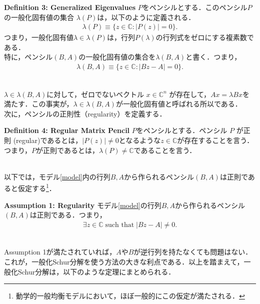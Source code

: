 \documentclass[a4j, dvipdfmx]{jarticle}
\begin{document}
\begin{itembox}[l]{{\bf Definition 3: Generalized Eigenvalues}}
$P$をペンシルとする．このペンシル$P$の一般化固有値の集合 $\lambda(P)$は，以下のように定義される．
\begin{align*}
\lambda(P) \equiv \{z\in \mathbb{C}: |P(z)| = 0\}.
\end{align*}
つまり，一般化固有値$\lambda \in \lambda(P)$は，行列$P(\lambda)$の行列式をゼロにする複素数である．\\
特に，ペンシル$(B,A)$の一般化固有値の集合を$\lambda(B,A)$と書く．つまり，
\begin{align*}
\lambda(B,A) \equiv \{z\in\mathbb{C}: |Bz-A|=0\}.
\end{align*}
\end{itembox}
\\
$\lambda \in \lambda(B,A)$に対して，ゼロでないベクトル $x \in \mathbb{C}^n$ が存在して，$Ax = \lambda Bx$を満たす．この事実が，$\lambda\in\lambda(B,A)$が一般化固有値と呼ばれる所以である．\\

次に，ペンシルの正則性（regularity）を定義する．\\

\begin{itembox}[l]{{\bf Definition 4: Regular Matrix Pencil}}
$P$をペンシルとする．ペンシル $P$ が正則 (regular)であるとは，$|P(z)|\not=0$となるような$z\in\mathbb{C}$が存在することを言う．つまり，$P$が正則であるとは，$\lambda(P)\not=\mathbb{C}$であることを言う．
\end{itembox}
\\

以下では，モデル\eqref{model}内の行列$B,A$から作られるペンシル$(B,A)$は正則であると仮定する\footnote{動学的一般均衡モデルにおいて，ほぼ一般的にこの仮定が満たされる．}．\\

\begin{itembox}[l]{{\bf Assumption 1: Regularity}}
モデル\eqref{model}の行列$B,A$から作られるペンシル$(B,A)$は正則である．つまり，
\begin{align*}
\exists z \in \mathbb{C} \; \text{such that} \; |Bz - A| \not= 0.
\end{align*}
\end{itembox}
\\

Assumption 1が満たされていれば，$A$や$B$が逆行列を持たなくても問題はない．これが，一般化Schur分解を使う方法の大きな利点である．以上を踏まえて，一般化Schur分解は，以下のような定理にまとめられる．\\
\end{document}
